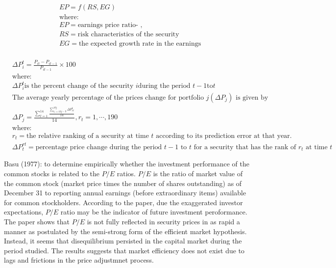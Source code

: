 \documentclass[
  letterpaper,
  DIV=11,
  numbers=noendperiod]{scrreprt}
\begin{document}
\begin{align}
    &EP = f(RS, EG) \\
    &\text{where:} \nonumber \\
    & EP = \text{earnings price ratio- }, \nonumber \\
    & RS = \text{risk characteristics of the security} \nonumber \\
    & EG =\text{the expected growth rate in the earnings} \nonumber \\
\end{align}
\label{Equation:OferEquation1975EquationOne}

\begin{align}
    & \Delta P_{i}^{t} = \frac{P_{it}-P_{it-1}}{P_{it-1}} \times 100 \\
    & \text{where:} \nonumber \\ 
    & \Delta P_{i}^{t} \text{is the percent change of the security } i \text{during the period } t-1 \text{to} t \nonumber \\
    & \text{The average yearly percentage of the prices change for portfolio } j (\Delta P_j) \text{ is given by} \nonumber \\
    & \Delta P_{j} =\frac{\sum_{t=1}^{14} \frac{\sum_{r_t=10j-9}^{10j} \Delta P_{rt}^{t}}{14} }{14}, r_{t}=1,\cdots,190 \nonumber\\
    & \text{where:} \nonumber \\
    & r_{t} = \text{the relative ranking of a security at time } t \text{ according to its prediction error at that year}. \\
    & \Delta P_{t}^{rt} = \text{percentage price change during the period } t-1 \text{ to } t \text{ for a security that has the rank of } r_t \text{ at time } t
\end{align}
\label{Equation:OferEquation1975}

Basu (1977): to determine empirically whether the investment performance
of the common stocks is related to the \(P/E\) ratios. \(P/E\) is the
ratio of market value of the common stock (market price times the number
of shares outstanding) as of December 31 to reporting annual earnings
(before extraordinary items) available for common stockholders.
According to the paper, due the exaggerated investor expectations,
\(P/E\) ratio may be the indicator of future investment peroformance.
The paper shows that \(P/E\) is not fully reflected in security prices
in as rapid a manner as postulated by the semi-strong form of the
efficient market hypothesis. Instead, it seems that disequilibrium
persisted in the capital market during the period studied. The results
suggests that market efficiency does not exist due to lags and frictions
in the price adjustmnet process.
\end{document}
